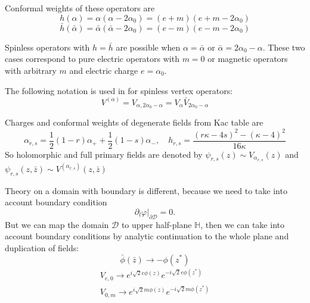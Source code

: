 \documentclass[12pt]{article}
\begin{document}
Conformal weights of these operators are 
\begin{equation}
  \label{eq:136}
  h(\alpha)=\alpha(\alpha-2\alpha_{0})=(e+m)(e+m-2\alpha_{0})
\end{equation}
\begin{equation}
  \label{eq:137}
  \bar h(\bar\alpha)=\bar\alpha(\bar\alpha-2\alpha_{0})=(e-m)(e-m-2\alpha_{0})
\end{equation}

Spinless operators with $h=\bar h$ are possible when $\alpha=\bar\alpha$ or
$\bar\alpha=2\alpha_{0}-\alpha$. These two cases correspond to pure electric operators with $m=0$ or
magnetic operators with arbitrary $m$ and electric charge $e=\alpha_{0}$. 

The following notation is used in \cite{gruzberg2006stochastic} for spinless vertex operators:
\begin{equation}
  \label{eq:138}
  V^{(\alpha)}=V_{\alpha,2\alpha_{0}-\alpha}=V_{\alpha}\bar V_{2\alpha_{0}-\alpha}
\end{equation}

Charges and conformal weights of degenerate fields from Kac table are
\begin{equation}
  \label{eq:139}
  \alpha_{r,s}=\frac{1}{2}(1-r)\alpha_{+}+\frac{1}{2}(1-s)\alpha_{-},\quad h_{r,s}=\frac{(r\kappa-4s)^{2}-(\kappa-4)^{2}}{16\kappa}
\end{equation}
So holomorphic and full primary fields are denoted by $\psi_{r,s}(z)\sim V_{\alpha_{r,s}}(z)$ and
$\psi_{r,s}(z,\bar z)\sim V^{(\alpha_{r,s})}(z,\bar z)$

Theory on a domain with boundary is different, because we need to take into account boundary condition
\begin{equation}
  \label{eq:140}
  \partial_{l}\varphi|_{\partial \mathcal{D}}=0.
\end{equation}
But we can map the domain $\mathcal{D}$ to upper half-plane $\mathbb{H}$, then we can take into
account boundary conditions by analytic continuation to the whole plane and duplication of fields:
\begin{equation}
  \label{eq:141}
  \bar\phi(\bar z)\to -\phi(z^{*})
\end{equation}
\begin{eqnarray}
  \label{eq:142}
  V_{e,0}\to e^{i\sqrt{2}e\phi(z)} e^{-i\sqrt{2} e \phi(z^{*})}\\
  V_{0,m}\to e^{i\sqrt{2}m\phi(z)} e^{-i\sqrt{2} m \phi(z^{*})}
\end{eqnarray}
\end{document}
